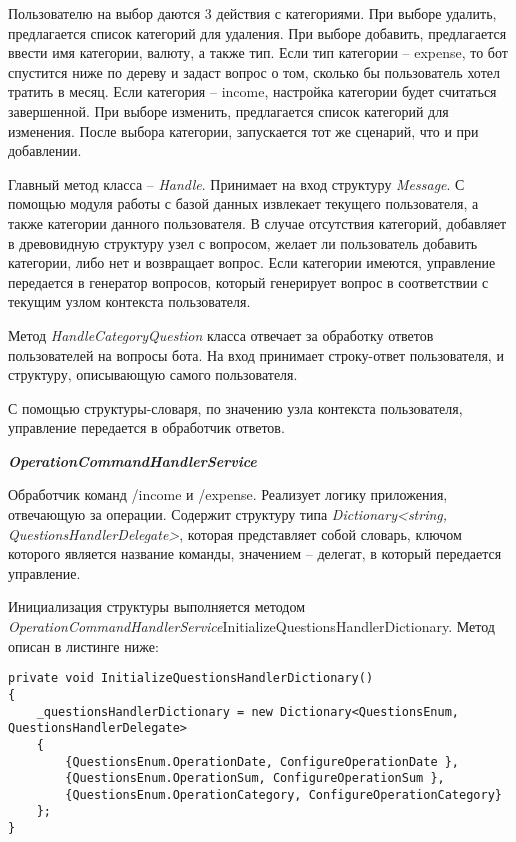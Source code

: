 Пользователю на выбор даются 3 действия с категориями. При выборе удалить, предлагается список категорий для удаления. При выборе добавить, предлагается ввести имя категории, валюту, а также тип. Если тип категории – expense, то бот спустится ниже по дереву и задаст вопрос о том, сколько бы пользователь хотел тратить в месяц. Если категория – income, настройка категории будет считаться завершенной. При выборе изменить, предлагается список категорий для изменения. После выбора категории, запускается тот же сценарий, что и при добавлении.

Главный метод класса – \emph{Handle}. Принимает на вход структуру \emph{Message}. С помощью модуля работы с базой данных извлекает текущего пользователя, а также категории данного пользователя. В случае отсутствия категорий, добавляет в древовидную структуру узел с вопросом, желает ли пользователь добавить категории, либо нет и возвращает вопрос. Если категории имеются, управление передается в генератор вопросов, который генерирует вопрос в соответствии с текущим узлом контекста пользователя.

Метод \emph{HandleCategoryQuestion} класса отвечает за обработку ответов
пользователей на вопросы бота. На вход принимает строку-ответ
пользователя, и структуру, описывающую самого пользователя.

С помощью структуры-словаря, по значению узла контекста
пользователя, управление передается в обработчик ответов.

\textbf{\emph{OperationCommandHandlerService}}

Обработчик команд /income и /expense. Реализует логику приложения,
отвечающую за операции. Содержит структуру типа \emph{Dictionary<string,
QuestionsHandlerDelegate>}, которая представляет собой словарь, ключом
которого является название команды, значением – делегат, в который
передается управление.

Инициализация структуры выполняется методом \linebreak
\emph{OperationCommandHandlerService}InitializeQuestionsHandlerDictionary. Метод описан в листинге ниже:

\lstset{style=sharpc}
\begin{lstlisting}
private void InitializeQuestionsHandlerDictionary()
{
	_questionsHandlerDictionary = new Dictionary<QuestionsEnum, QuestionsHandlerDelegate>
	{
		{QuestionsEnum.OperationDate, ConfigureOperationDate },
		{QuestionsEnum.OperationSum, ConfigureOperationSum },
		{QuestionsEnum.OperationCategory, ConfigureOperationCategory}
	};
}
\end{lstlisting}

